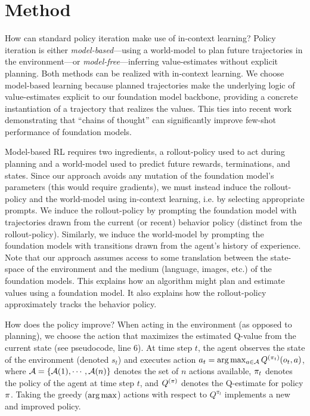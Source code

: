 \documentclass{article}
\begin{document}
\section{Method}
\label{sec:algorithm}

How can standard policy iteration make use of in-context learning? Policy
iteration is either \textit{model-based}---using a world-model to plan future
trajectories in the environment---or \textit{model-free}---inferring
value-estimates without explicit planning. Both methods can be realized with
in-context learning. We choose model-based learning because planned trajectories
make the underlying logic of value-estimates explicit to our foundation model
backbone, providing a concrete instantiation of a trajectory that realizes the
values. This ties into recent work
\parencite{wei_chain_2022,nye_show_2021}
demonstrating that ``chains of thought'' can significantly improve few-shot
performance of foundation models.

Model-based RL requires two ingredients, a rollout-policy used to act during
planning and a world-model used to predict future rewards, terminations, and
states. Since our approach avoids any mutation of the foundation model's
parameters (this would require gradients), we must instead induce the
rollout-policy and the world-model using in-context learning, i.e. by selecting
appropriate prompts. We induce the rollout-policy by prompting the foundation
model with trajectories drawn from the current (or recent) behavior policy
(distinct from the rollout-policy). Similarly, we induce the world-model by
prompting the foundation models with transitions drawn from the agent's history
of experience. Note that our approach assumes access to some translation between
the state-space of the environment and the medium (language, images, etc.) of
the foundation models. This explains how an algorithm might plan and estimate
values using a foundation model. It also explains how the rollout-policy
approximately tracks the behavior policy.

How does the policy improve? When acting in the environment (as opposed to
planning), we choose the action that maximizes the estimated Q-value from the
current state (see  pseudocode, line 6). At time step $t$,
the agent observes the state of the environment (denoted $s_t$) and executes
action $a_t = \argmax_{\Act \in \Actions} \Q^{\Policy_t}(\Obs_t,\Act)$,
where $\mathcal{A} = \{\mathcal{A}(1),\cdots,\mathcal{A}(n)\}$ denotes the set of $n$
actions available, $\Policy_t$ denotes the policy of the agent at time step $t$,
and $\Q^{\Policy}$ denotes the Q-estimate for policy $\Policy$. Taking the
greedy ($\arg\max$) actions with respect to $Q^{\pi_t}$ implements a new and
improved policy.
\end{document}
